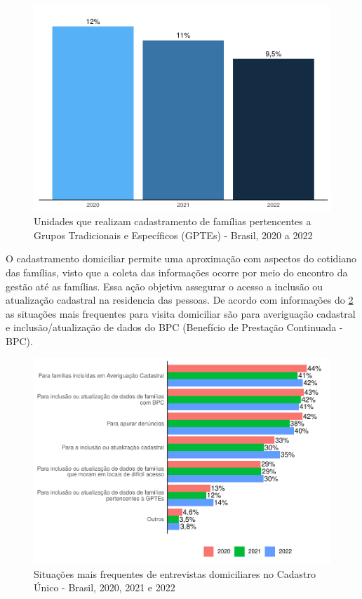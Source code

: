 \documentclass[
  brazilian]{report}
\begin{document}
\begin{figure}
\includegraphics{Censo-SUAS-2022_files/figure-latex/gptes-cadunico-1} \caption[Unidades que realizam cadastramento de famílias pertencentes a Grupos Tradicionais e Específicos (GPTEs) - Brasil, 2020 a 2022]{Unidades que realizam cadastramento de famílias pertencentes a Grupos Tradicionais e Específicos (GPTEs) - Brasil, 2020 a 2022}\label{fig:gptes-cadunico}
\end{figure}

O cadastramento domiciliar permite uma aproximação com aspectos do
cotidiano das famílias, visto que a coleta das informações ocorre por
meio do encontro da gestão até as famílias. Essa ação objetiva assegurar
o acesso a inclusão ou atualização cadastral na residencia das pessoas.
De acordo com informações do \cref{fig:visit_dom} as situações mais
frequentes para visita domiciliar são para averiguação cadastral e
inclusão/atualização de dados do BPC (Benefício de Prestação Continuada
- BPC).

\begin{figure}
\includegraphics{Censo-SUAS-2022_files/figure-latex/visit_dom-1} \caption[Situações mais frequentes de entrevistas domiciliares no Cadastro Único - Brasil, 2020, 2021 e 2022]{Situações mais frequentes de entrevistas domiciliares no Cadastro Único - Brasil, 2020, 2021 e 2022}\label{fig:visit_dom}
\end{figure}
\end{document}
